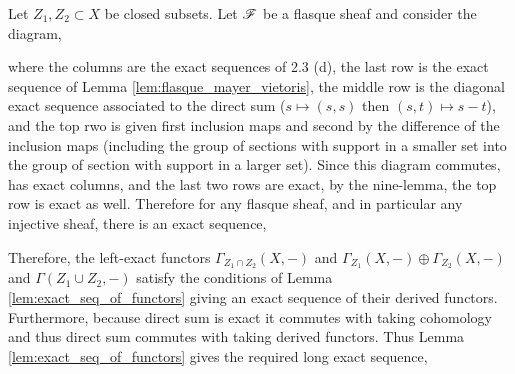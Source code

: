 \documentclass[12pt]{article}
\begin{document}
Let $Z_1, Z_2 \subset X$ be closed subsets. Let $\mathscr{F}$ be a flasque sheaf and consider the diagram,
\begin{center}
\end{center}
where the columns are the exact sequences of 2.3 (d), the last row is the exact sequence of Lemma \ref{lem:flasque_mayer_vietoris}, the middle row is the diagonal exact sequence associated to the direct sum ($s \mapsto (s, s)$ then $(s, t) \mapsto s - t$), and the top rwo is given first inclusion maps and second by the difference of the inclusion maps (including the group of sections with support in a smaller set into the group of section with support in a larger set). Since this diagram commutes, has exact columns, and the last two rows are exact, by the nine-lemma, the top row is exact as well. Therefore for any flasque sheaf, and in particular any injective sheaf, there is an exact sequence,
\begin{center}
\end{center}
Therefore, the left-exact functors $\Gamma_{Z_1 \cap Z_2}(X, -)$ and $\Gamma_{Z_1}(X, -) \oplus \Gamma_{Z_2}(X, -)$ and $\Gamma(Z_1 \cup Z_2, -)$ satisfy the conditions of Lemma \ref{lem:exact_seq_of_functors} giving an exact sequence of their derived functors. Furthermore, because direct sum is exact it commutes with taking cohomology and thus direct sum commutes with taking derived functors. Thus Lemma \ref{lem:exact_seq_of_functors} gives the required long exact sequence, 
\end{document}
